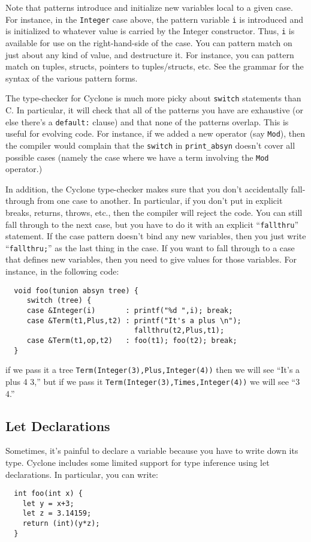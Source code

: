 Note that patterns introduce and initialize new variables local to a
given case.  For instance, in the \texttt{Integer} case above, the
pattern variable \texttt{i} is introduced and is initialized to whatever
value is carried by the Integer constructor.  Thus, \texttt{i} is
available for use on the right-hand-side of the case.  You can pattern
match on just about any kind of value, and destructure it.  For
instance, you can pattern match on tuples, structs, pointers to
tuples/structs, etc.  See the grammar for the syntax of the various
pattern forms.

The type-checker for Cyclone is much more picky about \texttt{switch}
statements than C\@.  In particular, it will check that all of the
patterns you have are exhaustive (or else there's a \texttt{default:}
clause) and that none of the patterns overlap.  This is useful for
evolving code.  For instance, if we added a new operator (say
\texttt{Mod}), then the compiler would complain that the \texttt{switch}
in \texttt{print_absyn} doesn't cover all possible cases (namely the
case where we have a term involving the \texttt{Mod} operator.)

In addition, the Cyclone type-checker makes sure that you don't
accidentally fall-through from one case to another.  In particular, if
you don't put in explicit breaks, returns, throws, etc., then the
compiler will reject the code.  You can still fall through to the next
case, but you have to do it with an explicit ``\texttt{fallthru}''
statement.  If the case pattern doesn't bind any new variables, then
you just write ``\texttt{fallthru;}'' as the last thing in the case.  If
you want to fall through to a case that defines new variables, then
you need to give values for those variables.  For instance, in the
following code:
\begin{verbatim}
  void foo(tunion absyn tree) {
     switch (tree) {
     case &Integer(i)       : printf("%d ",i); break;
     case &Term(t1,Plus,t2) : printf("It's a plus \n");
                              fallthru(t2,Plus,t1);
     case &Term(t1,op,t2)   : foo(t1); foo(t2); break;
  }
\end{verbatim}
if we pass it a tree \texttt{Term(Integer(3),Plus,Integer(4))} then we
will see ``It's a plus 4 3,'' but if we pass it
\texttt{Term(Integer(3),Times,Integer(4))} we will see ``3 4.''


\subsection{Let Declarations}
Sometimes, it's painful to declare a variable because you have to
write down its type.  Cyclone includes some limited support for type
inference using let declarations.  In particular, you can write:
\begin{verbatim}
  int foo(int x) {
    let y = x+3;
    let z = 3.14159;
    return (int)(y*z);
  }
\end{verbatim}

